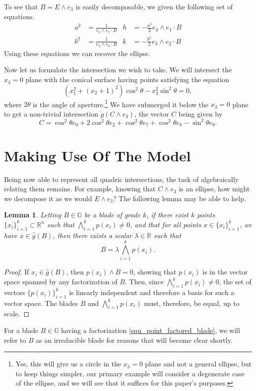 \documentclass{birkjour}
\newtheorem{lem}[thm]{Lemma}
\theoremstyle{definition}
\theoremstyle{remark}
\numberwithin{equation}{section}
\newcommand{\R}{\mathbb{R}}
\newcommand{\G}{\mathbb{G}}
\newcommand{\gd}{\dot{g}}
\newcommand{\gh}{\hat{g}}
\begin{document}
To see that $B=E\wedge e_3$ is easily decomposable, we given the following set of
equations.
\begin{align*}
a^2 &= \frac{1}{e_3\wedge e_7\cdot B} &
h &= -\frac{a^2}{2}e_3\wedge e_1\cdot B \\
b^2 &= \frac{1}{e_3\wedge e_8\cdot B} &
k &= -\frac{b^2}{2}e_3\wedge e_2\cdot B
\end{align*}
Using these equations we can recover the ellipse.

Now let us formulate the intersection we wish to take.  We will
intersect the $x_3=0$ plane with the conical surface having points satisfying the equation
\begin{equation*}
(x_1^2+(x_2+1)^2)\cos^2\theta - x_3^2\sin^2\theta = 0,
\end{equation*}
where $2\theta$ is the angle of aperture.\footnote{Yes, this will give
us a circle in the $x_3=0$ plane and not a general ellipse, but to keep things
simpler, our primary example will consider a degenerate case of the ellipse,
and we will see that it suffices for this paper's purposes.}  We have submerged it
below the $x_3=0$ plane to get a non-trivial intersection $\gd(C\wedge e_3)$,
the vector $C$ being given by
\begin{equation*}
C = \cos^2\theta e_0 + 2\cos^2\theta e_2 + \cos^2\theta e_7 + \cos^2\theta e_8 - \sin^2\theta e_9.
\end{equation*}

\section{Making Use Of The Model}

Being now able to represent all quadric intersections, the task of
algebraically relating them remains.  For example, knowing that
$C\wedge e_3$ is an ellipse, how might we decompose it
as we would $E\wedge e_3$?  The following lemma may be able to help.
\begin{lem}\label{lma_point_factored_blade}
Letting $B\in\G$ be a blade of grade $k$, if there exist $k$ points $\{x_i\}_{i=1}^k\subset\R^n$
such that $\bigwedge_{i=1}^k p(x_i)\neq 0$, and that for all points
$x\in\{x_i\}_{i=1}^k$, we have $x\in\gh(B)$, then there exists a scalar $\lambda\in\R$
such that
\begin{equation}\label{equ_point_factored_blade}
B = \lambda\bigwedge_{i=1}^k p(x_i).
\end{equation}
\end{lem}
\begin{proof}
If $x_i\in\gh(B)$, then $p(x_i)\wedge B=0$, showing that $p(x_i)$ is in the vector
space spanned by any factorization of $B$.  Then, since $\bigwedge_{i=1}^k p(x_i)\neq 0$,
the set of vectors $\{p(x_i)\}_{i=1}^k$ is linearly independent and therefore
a basis for such a vector space.  The blades $B$ and $\bigwedge_{i=1}^k p(x_i)$
must, therefore, be equal, up to scale.
\end{proof}
For a blade $B\in\G$ having a factorization \eqref{equ_point_factored_blade},
we will refer to $B$ as an irreducible blade for reasons that will become clear shortly.
\end{document}
